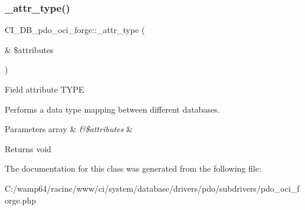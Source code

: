 \subsubsection{\texorpdfstring{\+\_\+attr\+\_\+type()}{\_attr\_type()}}
{\footnotesize\ttfamily C\+I\+\_\+\+D\+B\+\_\+pdo\+\_\+oci\+\_\+forge\+::\+\_\+attr\+\_\+type (\begin{DoxyParamCaption}\item[{\&}]{\$attributes }\end{DoxyParamCaption})\hspace{0.3cm}{\ttfamily [protected]}}

Field attribute T\+Y\+PE

Performs a data type mapping between different databases.


\begin{DoxyParams}[1]{Parameters}
array & {\em \&\$attributes} & \\
\hline
\end{DoxyParams}
\begin{DoxyReturn}{Returns}
void 
\end{DoxyReturn}


The documentation for this class was generated from the following file\+:\begin{DoxyCompactItemize}
\item 
C\+:/wamp64/racine/www/ci/system/database/drivers/pdo/subdrivers/pdo\+\_\+oci\+\_\+forge.\+php\end{DoxyCompactItemize}
